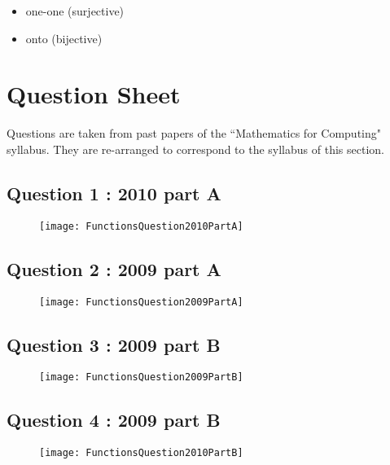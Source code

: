 \documentclass{article}
\begin{document}
\begin{itemize}
	\item one-one (surjective)
	\item onto (bijective)
\end{itemize}
\newpage
\section*{Question Sheet}
Questions are taken from past papers of the ``Mathematics for Computing" syllabus.  They are re-arranged to correspond to the syllabus of this section.


\newpage
\subsection*{Question 1 : 2010 part A}
\begin{figure}[h!]
	\centering
	\texttt{[image: FunctionsQuestion2010PartA]}
	
\end{figure}


\newpage
\subsection*{Question 2 : 2009 part A}
\begin{figure}[h!]
\centering
\texttt{[image: FunctionsQuestion2009PartA]}
\end{figure}


\newpage
\subsection*{Question 3 : 2009 part B}
\begin{figure}[h!]
	\centering
	\texttt{[image: FunctionsQuestion2009PartB]}
	
\end{figure}

\newpage
\subsection*{Question 4 : 2009 part B}
\begin{figure}[h!]
	\centering
	\texttt{[image: FunctionsQuestion2010PartB]}
	
\end{figure}
\end{document}
